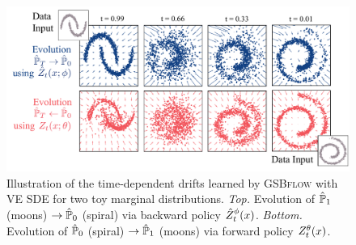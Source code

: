 \begin{figure}[t]
     \centering
         \centering
         \includegraphics[width=0.9\linewidth]{figures/fig_pred_gsbve_toy_spiral_moon.pdf}
         \caption{Illustration of the time-dependent drifts learned by \textsc{GSBflow} with VE SDE for two toy marginal distributions. \emph{Top.} Evolution of $\hat{\mathbb{P}}_{ {1}}$ (moons) $\rightarrow \hat{\mathbb{P}}_{ {0} }$ (spiral) via backward policy {\color{blue} $\SBb$}. \emph{Bottom.} Evolution of $\hat{\mathbb{P}}_{ {0} }$ (spiral) $\rightarrow \hat{\mathbb{P}}_{ {1}}$ (moons) via forward policy {\color{pink} $\SBf$}.}
        \label{fig:res_synthetic}
\end{figure}

\begin{table}[t]
    \caption{Evaluation of predictive performance w.r.t. the entropy-regularized Wasserstein distance $W_\varepsilon$ \citep{cuturi2013sinkhorn} of \textsc{GSBflow} and baselines on generating different single-cell datasets (using 3 runs).}
    \label{tab:exp_wasserstein_cells}
    \centering
{}
\end{table}


